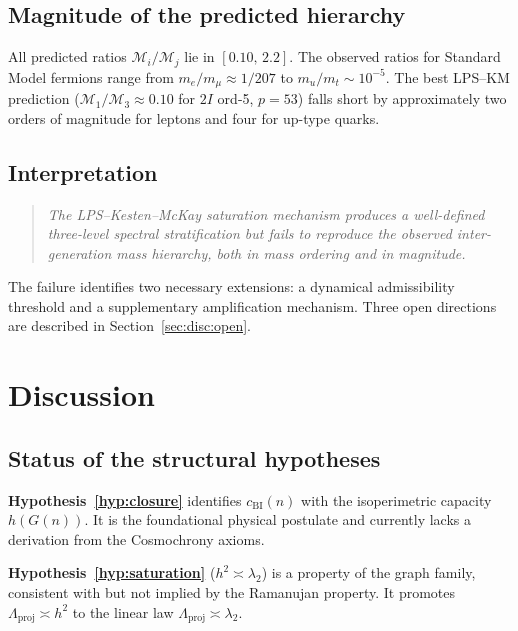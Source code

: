\documentclass[12pt, a4paper]{article}
\theoremstyle{plain}
\theoremstyle{definition}
\theoremstyle{remark}
\begin{document}
    \subsection{Magnitude of the predicted hierarchy}
      \label{sec:amp:magnitude}

      All predicted ratios $\mathcal{M}_i/\mathcal{M}_j$ lie in $[0.10,\, 2.2]$.
      The observed ratios for Standard Model fermions range from $m_e/m_\mu \approx
  1/207$ to $m_u/m_t \sim 10^{-5}$.
      The best LPS--KM prediction ($\mathcal{M}_1/\mathcal{M}_3 \approx 0.10$ for
      $2I$ ord-5, $p=53$) falls short by approximately two orders of magnitude for
      leptons and four for up-type quarks.

    \subsection{Interpretation}
      \label{sec:amp:interpretation}

      \begin{quote}
        \emph{The LPS--Kesten--McKay saturation mechanism produces a well-defined
        three-level spectral stratification but fails to reproduce the observed
        inter-generation mass hierarchy, both in mass ordering and in magnitude.}
      \end{quote}

      The failure identifies two necessary extensions: a dynamical admissibility
      threshold and a supplementary amplification mechanism.
      Three open directions are described in Section~\ref{sec:disc:open}.
  \section{Discussion}
    \label{sec:discussion}

    \subsection{Status of the structural hypotheses}
      \label{sec:disc:hypotheses}

      \textbf{Hypothesis~\ref{hyp:closure}} identifies $c_{\mathrm{BI}}(n)$ with the
      isoperimetric capacity $h(G(n))$.
      It is the foundational physical postulate and currently lacks a derivation
      from the Cosmochrony axioms.

      \textbf{Hypothesis~\ref{hyp:saturation}} ($h^2 \asymp \lambda_2$) is a
      property of the graph family, consistent with but not implied by the Ramanujan
      property.
      It promotes $\Lambda_{\mathrm{proj}} \asymp h^2$ to the linear law
      $\Lambda_{\mathrm{proj}} \asymp \lambda_2$.
\end{document}
